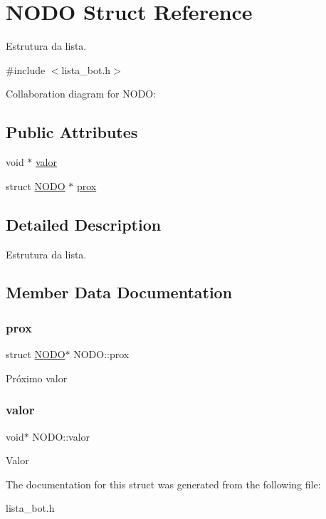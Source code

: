 \hypertarget{structNODO}{}\section{N\+O\+DO Struct Reference}
\label{structNODO}


Estrutura da lista.  




{\ttfamily \#include $<$lista\+\_\+bot.\+h$>$}



Collaboration diagram for N\+O\+DO\+:
\subsection*{Public Attributes}
\begin{DoxyCompactItemize}
\item 
void $\ast$ \hyperlink{structNODO_a7295ec923d6d0ffeed534d397f49f535}{valor}
\item 
struct \hyperlink{structNODO}{N\+O\+DO} $\ast$ \hyperlink{structNODO_a78014339586cd5cc8579603c69d3e301}{prox}
\end{DoxyCompactItemize}


\subsection{Detailed Description}
Estrutura da lista. 

\subsection{Member Data Documentation}
\mbox{\label{structNODO_a78014339586cd5cc8579603c69d3e301}} 
\subsubsection{\texorpdfstring{prox}{prox}}
{\footnotesize\ttfamily struct \hyperlink{structNODO}{N\+O\+DO}$\ast$ N\+O\+D\+O\+::prox}

Próximo valor \mbox{\label{structNODO_a7295ec923d6d0ffeed534d397f49f535}} 
\subsubsection{\texorpdfstring{valor}{valor}}
{\footnotesize\ttfamily void$\ast$ N\+O\+D\+O\+::valor}

Valor 

The documentation for this struct was generated from the following file\+:\begin{DoxyCompactItemize}
\item 
lista\+\_\+bot.\+h\end{DoxyCompactItemize}
